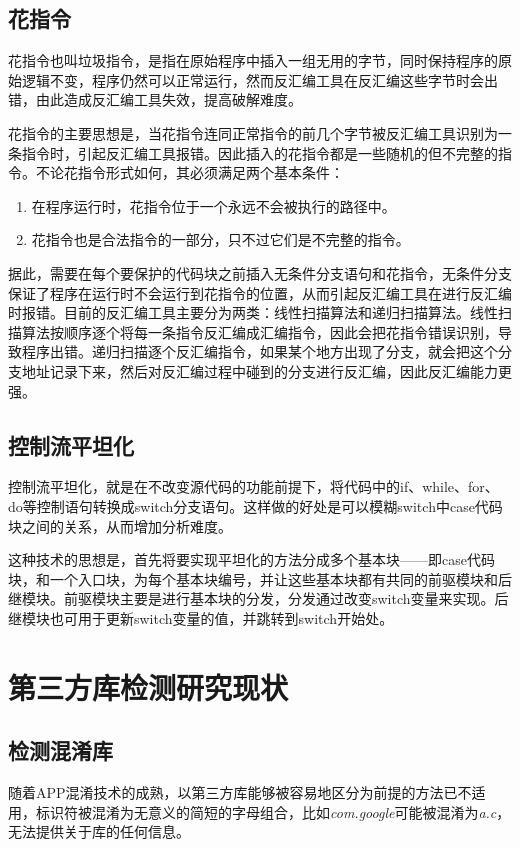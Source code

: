 \subsection{花指令}
花指令也叫垃圾指令，是指在原始程序中插入一组无用的字节，同时保持程序的原始逻辑不变，程序仍然可以正常运行，然而反汇编工具在反汇编这些字节时会出错，由此造成反汇编工具失效，提高破解难度\cite{and}。

花指令的主要思想是，当花指令连同正常指令的前几个字节被反汇编工具识别为一条指令时，引起反汇编工具报错。因此插入的花指令都是一些随机的但不完整的指令。不论花指令形式如何，其必须满足两个基本条件：
\begin{enumerate}
\item{在程序运行时，花指令位于一个永远不会被执行的路径中。}
\item{花指令也是合法指令的一部分，只不过它们是不完整的指令。}
\end{enumerate}

据此，需要在每个要保护的代码块之前插入无条件分支语句和花指令，无条件分支保证了程序在运行时不会运行到花指令的位置，从而引起反汇编工具在进行反汇编时报错。目前的反汇编工具主要分为两类：线性扫描算法和递归扫描算法。线性扫描算法按顺序逐个将每一条指令反汇编成汇编指令，因此会把花指令错误识别，导致程序出错\cite{huazhiling}。递归扫描逐个反汇编指令，如果某个地方出现了分支，就会把这个分支地址记录下来，然后对反汇编过程中碰到的分支进行反汇编，因此反汇编能力更强。

\subsection{控制流平坦化}
控制流平坦化，就是在不改变源代码的功能前提下，将代码中的if、while、for、do等控制语句转换成switch分支语句。这样做的好处是可以模糊switch中case代码块之间的关系，从而增加分析难度\cite{balachandran2016control}\cite{laszlo2009obfuscating}。

这种技术的思想是，首先将要实现平坦化的方法分成多个基本块——即case代码块，和一个入口块，为每个基本块编号，并让这些基本块都有共同的前驱模块和后继模块。前驱模块主要是进行基本块的分发，分发通过改变switch变量来实现。后继模块也可用于更新switch变量的值，并跳转到switch开始处\cite{王柯林2021基于随机森林的抗混淆}。





\section{第三方库检测研究现状}

\subsection{检测混淆库}
随着APP混淆技术的成熟，以第三方库能够被容易地区分为前提的方法已不适用，标识符被混淆为无意义的简短的字母组合，比如\textit{com.google}可能被混淆为\textit{a.c}，无法提供关于库的任何信息。



